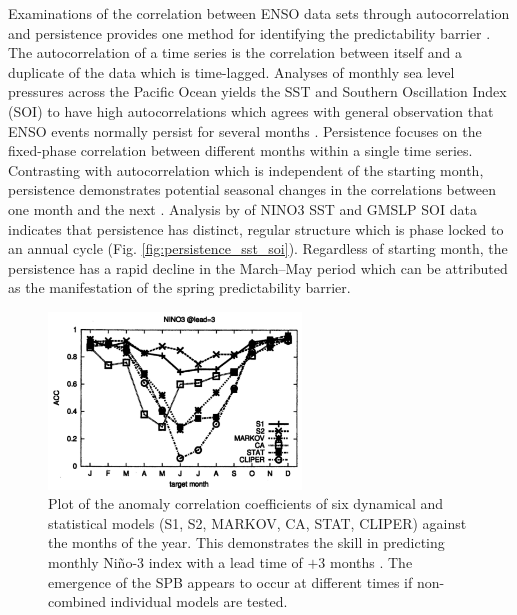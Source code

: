 \documentclass[12pt, onecolumn]{revtex4}    %
\begin{document}
\noindent
Examinations of the correlation between ENSO data sets through autocorrelation and persistence provides one method for identifying the predictability barrier \citep{torrence1998annual}. The autocorrelation of a time series is the correlation between itself and a duplicate of the data which is time-lagged. Analyses of monthly sea level pressures across the Pacific Ocean yields the SST and Southern Oscillation Index (SOI) to have high autocorrelations which agrees with general observation that ENSO events normally persist for several months \citep{trenberth1976spatial}. Persistence focuses on the fixed-phase correlation between different months within a single time series. Contrasting with autocorrelation which is independent of the starting month, persistence demonstrates potential seasonal changes in the correlations between one month and the next \citep{troup1965southern}. Analysis by \cite{torrence1998annual} of NINO3 SST and GMSLP SOI data indicates that persistence has distinct, regular structure which is phase locked to an annual cycle (Fig. \ref{fig:persistence_sst_soi}). Regardless of starting month, the persistence has a rapid decline in the March--May period which can be attributed as the manifestation of the spring predictability barrier. \\

\begin{figure}
\includegraphics[width=0.6\textwidth]{data/ecmwf_data}
\caption[Persistence]{Plot of the anomaly correlation coefficients of six dynamical and statistical models (S1, S2, MARKOV, CA, STAT, CLIPER) against the months of the year. This demonstrates the skill in predicting monthly Ni\~{n}o-3 index with a lead time of $+3$ months \citep{jan2005did}. The emergence of the SPB appears to occur at different times if non-combined individual models are tested.}
\label{fig:ecmwf_plot}
\end{figure}
\end{document}
